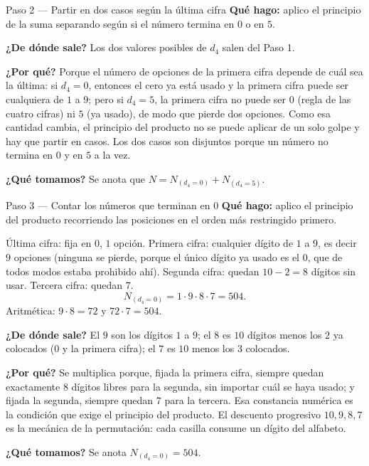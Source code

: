 \documentclass[11pt]{article}
\begin{document}
\begin{paso}{Paso 2 --- Partir en dos casos según la última cifra}
\textbf{Qué hago:} aplico el principio de la suma separando según si el número termina en $0$ o en $5$.

\textbf{¿De dónde sale?} Los dos valores posibles de $d_4$ salen del Paso 1.

\textbf{¿Por qué?} Porque el número de opciones de la primera cifra depende de cuál sea la última: si $d_4=0$, entonces el cero ya está usado y la primera cifra puede ser cualquiera de $1$ a $9$; pero si $d_4=5$, la primera cifra no puede ser $0$ (regla de las cuatro cifras) ni $5$ (ya usado), de modo que pierde dos opciones. Como esa cantidad cambia, el principio del producto no se puede aplicar de un solo golpe y hay que partir en casos. Los dos casos son disjuntos porque un número no termina en $0$ y en $5$ a la vez.

\textbf{¿Qué tomamos?} Se anota que $N=N_{(d_4=0)}+N_{(d_4=5)}$.
\end{paso}

\begin{paso}{Paso 3 --- Contar los números que terminan en 0}
\textbf{Qué hago:} aplico el principio del producto recorriendo las posiciones en el orden más restringido primero.

Última cifra: fija en $0$, $1$ opción. Primera cifra: cualquier dígito de $1$ a $9$, es decir $9$ opciones (ninguna se pierde, porque el único dígito ya usado es el $0$, que de todos modos estaba prohibido ahí). Segunda cifra: quedan $10-2=8$ dígitos sin usar. Tercera cifra: quedan $7$.
\[
  N_{(d_4=0)}=1\cdot 9\cdot 8\cdot 7 = 504 .
\]
Aritmética: $9\cdot 8=72$ y $72\cdot 7=504$.

\textbf{¿De dónde sale?} El $9$ son los dígitos $1$ a $9$; el $8$ es $10$ dígitos menos los $2$ ya colocados ($0$ y la primera cifra); el $7$ es $10$ menos los $3$ colocados.

\textbf{¿Por qué?} Se multiplica porque, fijada la primera cifra, siempre quedan exactamente $8$ dígitos libres para la segunda, sin importar cuál se haya usado; y fijada la segunda, siempre quedan $7$ para la tercera. Esa constancia numérica es la condición que exige el principio del producto. El descuento progresivo $10,9,8,7$ es la mecánica de la permutación: cada casilla consume un dígito del alfabeto.

\textbf{¿Qué tomamos?} Se anota $N_{(d_4=0)}=504$.
\end{paso}
\end{document}
